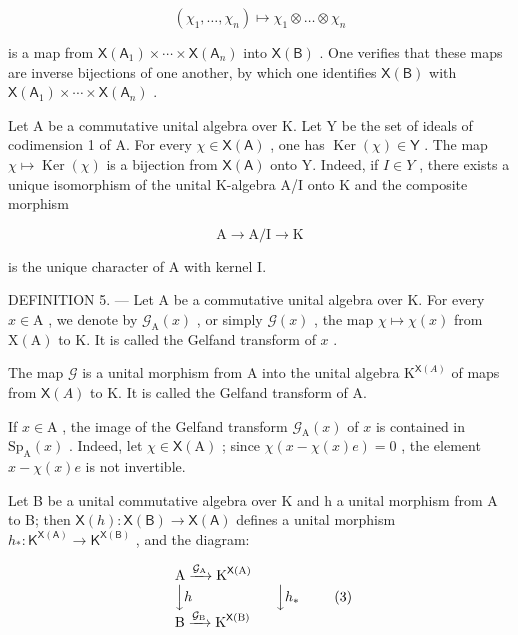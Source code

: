 \[
\left(\chi_ {1}, \dots , \chi_ {n}\right) \mapsto \chi_ {1} \otimes \dots \otimes \chi_ {n}
\]

is a map from \(\mathsf{X}(\mathsf{A}_{1}) \times \cdots \times \mathsf{X}(\mathsf{A}_{n})\) into \(\mathsf{X}(\mathsf{B})\) . One verifies that these maps are inverse bijections of one another, by which one identifies \(\mathsf{X}(\mathsf{B})\) with \(\mathsf{X}(\mathsf{A}_{1}) \times \cdots \times \mathsf{X}(\mathsf{A}_{n})\) .

Let A be a commutative unital algebra over K. Let Y be the set of ideals of codimension 1 of A. For every \(\chi \in \mathsf{X}(\mathsf{A})\) , one has \(\operatorname{Ker}(\chi) \in \mathsf{Y}\) . The map \(\chi \mapsto \operatorname{Ker}(\chi)\) is a bijection from \(\mathsf{X}(\mathsf{A})\) onto Y. Indeed, if \(I \in Y\) , there exists a unique isomorphism of the unital K-algebra A/I onto K and the composite morphism

\[
\mathrm{A} \longrightarrow \mathrm{A} / \mathrm{I} \longrightarrow \mathrm{K}
\]

is the unique character of A with kernel I.

DEFINITION 5. --- Let A be a commutative unital algebra over K. For every \(x \in \mathrm{A}\) , we denote by \(\mathcal{G}_{\mathrm{A}}(x)\) , or simply \(\mathcal{G}(x)\) , the map \(\chi \mapsto \chi(x)\) from \(\mathrm{X}(\mathrm{A})\) to K. It is called the Gelfand transform of \(x\) .

The map \(\mathcal{G}\) is a unital morphism from A into the unital algebra \(\mathrm{K}^{\mathsf{X}(A)}\) of maps from \(\mathsf{X}(A)\) to K. It is called the Gelfand transform of A.

If \(x \in \mathrm{A}\) , the image of the Gelfand transform \(\mathcal{G}_{\mathrm{A}}(x)\) of \(x\) is contained in \(\mathrm{Sp}_{\mathrm{A}}(x)\) . Indeed, let \(\chi \in \mathsf{X}(\mathrm{A})\) ; since \(\chi(x - \chi(x)e) = 0\) , the element \(x - \chi(x)e\) is not invertible.

Let B be a unital commutative algebra over K and h a unital morphism from A to B; then \(\mathsf{X}(h)\colon\mathsf{X}(\mathsf{B})\to\mathsf{X}(\mathsf{A})\) defines a unital morphism \(h_{*}\colon\mathsf{K}^{\mathsf{X}(\mathsf{A})}\to\mathsf{K}^{\mathsf{X}(\mathsf{B})}\) , and the diagram:

\[
\begin{array}{l} \text {A} \xrightarrow {\mathcal {G} _ {\text {A}}} \text {K} ^ {\mathsf {X} (\text {A})} \\ \Big \downarrow h \qquad \qquad \qquad \Big \downarrow h _ {*} \\ \text {B} \xrightarrow {\mathcal {G} _ {\text {B}}} \text {K} ^ {\mathsf {X} (\text {B})} \end{array}\tag{3}
\]

